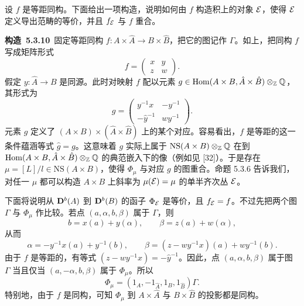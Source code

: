 设 $f$ 是等距同构。下面给出一项构造，说明如何由 $f$ 构造积上的对象 $\mathcal{E}$，使得 $\mathcal{E}$ 定义导出范畴的等价，并且 $f_{\mathcal{E}}$ 与 $f$ 重合。

\textbf{构造~5.3.10}\ 固定等距同构 $f:A\times\hat A\to B\times\hat B$，把它的图记作 $\Gamma$。如上，把同构 $f$ 写成矩阵形式
\begin{equation*}
f=\begin{pmatrix}x&y\\ z&w\end{pmatrix}.
\end{equation*}
假定 $y:\hat A\to B$ 是同源。此时对映射 $f$ 配以元素 $g\in\operatorname{Hom}(A\times B,\hat A\times\hat B)\otimes_{\mathbb{Z}}\mathbb{Q}$，其形式为
\begin{equation*}
g=\begin{pmatrix}y^{-1}x&-y^{-1}\\ -\hat y^{-1}&wy^{-1}\end{pmatrix}.
\end{equation*}
元素 $g$ 定义了 $(A\times B)\times(\hat A\times\hat B)$ 上的某个对应。容易看出，$f$ 是等距的这一条件蕴涵等式 $\hat g=g$。这意味着 $g$ 实际上属于 $\mathrm{NS}(A\times B)\otimes_{\mathbb{Z}}\mathbb{Q}$ 在到 $\operatorname{Hom}(A\times B,\hat A\times\hat B)\otimes_{\mathbb{Z}}\mathbb{Q}$ 的典范嵌入下的像（例如见 [32]）。于是存在 $\mu=[L]/l\in\mathrm{NS}(A\times B)$，使得 $\Phi_\mu$ 与对应 $g$ 的图重合。命题 5.3.6 告诉我们，对任一 $\mu$ 都可以构造 $A\times B$ 上斜率为 $\mu(\mathcal{E})=\mu$ 的单半齐次丛 $\mathcal{E}$。


下面将说明从 $\mathbf{D}^{b}(A)$ 到 $\mathbf{D}^{b}(B)$ 的函子 $\Phi_{\mathcal{E}}$ 是等价，且 $f_{\mathcal{E}}=f$。不过先把两个图 $\Gamma$ 与 $\Phi_\mu$ 作比较。若点 $(a,\alpha,b,\beta)$ 属于 $\Gamma$，则
\begin{equation*}
b=x(a)+y(\alpha),\qquad \beta=z(a)+w(\alpha),
\end{equation*}
从而
\begin{equation*}
\alpha=-y^{-1}x(a)+y^{-1}(b),\qquad \beta=(z-wy^{-1}x)(a)+wy^{-1}(b).
\end{equation*}
由于 $f$ 是等距的，有等式 $(z-wy^{-1}x)=-\hat y^{-1}$。因此，点 $(a,\alpha,b,\beta)$ 属于图 $\Gamma$ 当且仅当 $(a,-\alpha,b,\beta)$ 属于 $\Phi_\mu$。所以
\begin{equation*}
\Phi_\mu=(1_A,-1_{\hat A},1_B,1_{\hat B})\Gamma.
\end{equation*}
特别地，由于 $f$ 是同构，可知 $\Phi_\mu$ 到 $A\times\hat A$ 与 $B\times\hat B$ 的投影都是同构。

